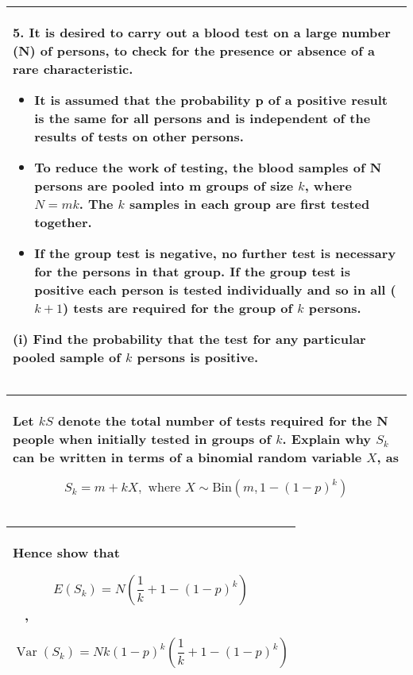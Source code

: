 \documentclass[a4paper,12pt]{article}
\begin{document}
\begin{table}[ht!]
     \centering
     \begin{tabular}{|p{15cm}|}
     \hline        \large
5. It is desired to carry out a blood test on a large number (N) of persons, to check for the presence or absence of a rare characteristic. 

\begin{itemize}
    \item It is assumed that the probability p of a positive result is the same for all persons and is independent of the results of tests on other persons. 
 
\item To reduce the work of testing, the blood samples of N persons are pooled into m groups of size $k$, where $N = mk$.  The $k$ samples in each group are first tested together.  

\item If the group test is negative, no further test is necessary for the persons in that group.  If the group test is positive each person is tested individually and so in all ($k + 1$) tests are required for the group of $k$ persons. 
\end{itemize} 
 
(i) Find the probability that the test for any particular pooled sample of $k$ persons is positive. 
 
\\ \hline
      \end{tabular}
    \end{table}
    
  \begin{table}[ht!]
     \centering
     \begin{tabular}{|p{15cm}|}
     \hline   Let $kS$ denote the total number of tests required for the N people when initially tested in groups of $k$.  Explain why $S_k$ can be written in terms of a binomial random variable $X$, as 
 
\[S_k = m + kX, \mbox{ where } X \sim \mbox{Bin}\left(m, 1-(1-p)^k\right)\]
\\ \hline
      \end{tabular}
    \end{table}
    
  \begin{table}[ht!]
     \centering
     \begin{tabular}{|p{15cm}|}
     \hline \large  Hence show that 

\[ E(S_k) =  N \left( \frac{1}{k} + 1-(1-p)^k\right)  \] , 
 
\[ \operatorname{Var}(S_k) =  Nk (1-p)^k \left( \frac{1}{k} + 1-(1-p)^k\right)  \]
\\ \hline
      \end{tabular}
    \end{table}
    
\end{document}

